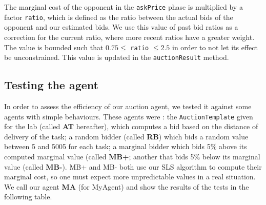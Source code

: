 \documentclass[12pt,a4paper]{article}
\begin{document}
The marginal cost of the opponent in the \texttt{askPrice} phase is multiplied by a factor \texttt{ratio}, which is defined as the ratio between the actual bids of the opponent and our estimated bids. We use this value of past bid ratios as a correction for the current ratio, where more recent ratios have a greater weight. The value is bounded such that $0.75 \leq $ \texttt{ratio} $\leq 2.5$ in order to not let its effect be unconstrained. This value is updated in the \texttt{auctionResult} method.

\subsection*{Testing the agent}
In order to assess the efficiency of our auction agent, we tested it against some agents with simple behaviours. These agents were : the \texttt{AuctionTemplate} given for the lab (called \textbf{AT} hereafter), which computes a bid based on the distance of delivery of the task; a random bidder (called \textbf{RB}) which bids a random value between 5 and 5005 for each task; a marginal bidder which bids 5\% above its computed marginal value (called \textbf{MB+}; another that bids 5\% below its marginal value (called \textbf{MB-}). MB+ and MB- both use our SLS algorithm to compute their marginal cost, so one must expect more unpredictable values in a real situation. We call our agent \textbf{MA} (for MyAgent) and show the results of the tests in the following table.
\end{document}
